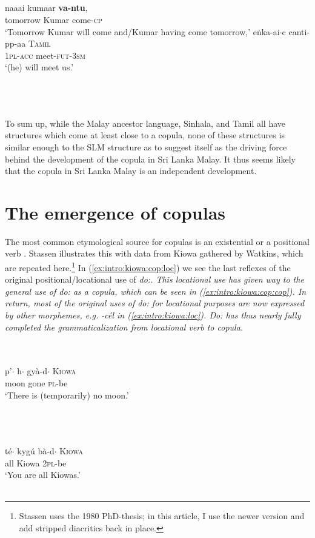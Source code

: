 \documentclass[a4paper,12pt]{article}
\newcommand{\xbox}[2]{\noindent\parbox[t]{#1}{#2}\noindent}
\newcommand{\xref}[1]{(\ref{#1})}
\newcommand{\ea}{\\\\}
\newcommand{\z}{\\\\}
\begin{document}
\xbox{\textwidth}{
\ea
\ea
\gll naa\dotl ai kumaar \textbf{va-ntu},\\
 tomorrow Kumar come-\textsc{cp}\\
 `Tomorrow Kumar will come and/Kumar having come tomorrow,'
\ex
\gll e\.nka\dotl-ai$\cdot$c canti-pp-aa\textipa{\textsubbar{n}}  \textsc{Tamil} \\
     \textsc{1pl}-\textsc{acc} meet-\textsc{fut}-\textsc{3sm} \\
    `(he) will meet us.' \citep[267]{Lehmann1989tamil}
\z
\z
} 

To sum up, while the Malay ancestor language, Sinhala, and Tamil all have structures which come at least close to a copula, none of these structures is similar enough to the SLM structure as to suggest itself as the driving force behind the development of the copula in Sri Lanka Malay. It thus seems likely that the copula in Sri Lanka Malay is an independent development.

\section{The emergence of copulas}\label{sec:sources}
The most common etymological source for copulas is an existential \citep{Munro1977} or a positional verb \citep[94]{Stassen1997}. Stassen illustrates this with data from Kiowa gathered by Watkins, which are repeated here.\footnote{Stassen uses the 1980 PhD-thesis; in this article, I use the newer version \citep{Watkins1984} and add stripped diacritics   back in place.} In \xref{ex:intro:kiowa:cop:loc} we see the last reflexes of the original positional/locational use of \em do:\em. This locational use has given way to the general use of \em do: \em as a copula, which can be seen in \xref{ex:intro:kiowa:cop:cop}. In return, most of the original uses of \em do:  \em for locational purposes are now expressed by other morphemes, e.g.  \em -cél \em in \xref{ex:intro:kiowa:loc}. \em Do: \em has thus nearly fully completed the grammaticalization from locational verb to copula.


\xbox{\textwidth}{
\ea\label{ex:intro:kiowa:cop:loc}
\gll p'\textipa{\'O}$\cdot$ h\textipa{\textpolhook{\'e}}$\cdot$ gyà-d\textipa{\'O}$\cdot$ \textsc{Kiowa} \\
     moon gone \textsc{pl}-be  \\
    `There is (temporarily)  no moon.' \citep[216]{Watkins1984}
\z
}

\xbox{\textwidth}{
\ea\label{ex:intro:kiowa:cop:cop}
\gll té$\cdot$ k\textipa{\'O}ygú bà-d\textipa{\'O}$\cdot$ \textsc{Kiowa}  \\
     all Kiowa \textsc{2pl}-be \\
    `You are all Kiowas.' \citep[227]{Watkins1984}
\z
} 
\end{document}

